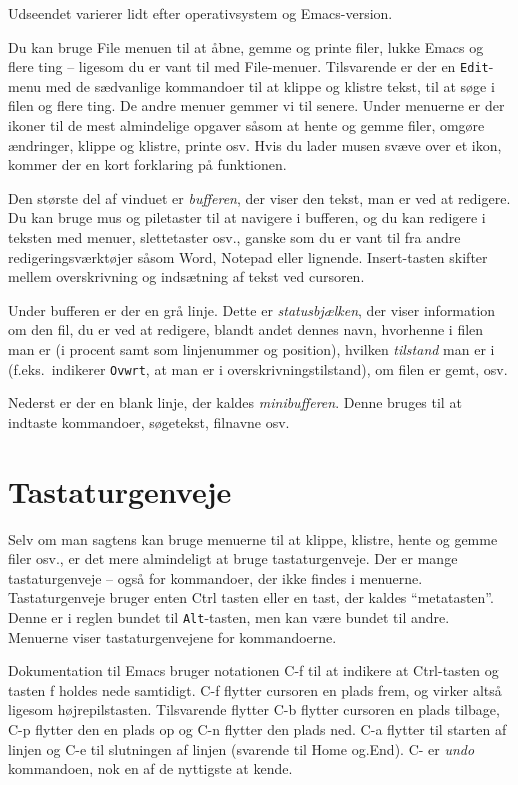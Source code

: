 \documentclass[a4paper]{article}
\begin{document}
\noindent
Udseendet varierer lidt efter operativsystem og Emacs-version.

Du kan bruge \textsf{File} menuen til at åbne, gemme og printe filer,
lukke Emacs og flere ting -- ligesom du er vant til med
\textsf{File}-menuer.  Tilsvarende er der en \texttt{Edit}-menu med de
sædvanlige kommandoer til at klippe og klistre tekst, til at søge i
filen og flere ting.  De andre menuer gemmer vi til senere.  Under
menuerne er der ikoner til de mest almindelige opgaver såsom at hente
og gemme filer, omgøre ændringer, klippe og klistre, printe osv.  Hvis
du lader musen svæve over et ikon, kommer der en kort forklaring på funktionen.

Den største del af vinduet er \emph{bufferen}, der viser den tekst,
man er ved at redigere.  Du kan bruge mus og piletaster til at
navigere i bufferen, og du kan redigere i teksten med menuer,
slettetaster osv., ganske som du er vant til fra andre
redigeringsværktøjer såsom Word, Notepad eller lignende.
\textsf{Insert}-tasten skifter mellem overskrivning og indsætning af
tekst ved cursoren.

Under bufferen er der en grå linje.  Dette er \emph{statusbjælken},
der viser information om den fil, du er ved at redigere, blandt andet
dennes navn, hvorhenne i filen man er (i procent samt som linjenummer
og position), hvilken \emph{tilstand} man er i (f.eks.\ indikerer
\texttt{Ovwrt}, at man er i overskrivningstilstand), om filen er gemt,
osv.

Nederst er der en blank linje, der kaldes \emph{minibufferen}.  Denne
bruges til at indtaste kommandoer, søgetekst, filnavne osv.

\section{Tastaturgenveje}\label{genveje}

Selv om man sagtens kan bruge menuerne til at klippe, klistre, hente
og gemme filer osv., er det mere almindeligt at bruge tastaturgenveje.
Der er mange tastaturgenveje -- også for kommandoer, der ikke findes i
menuerne.  Tastaturgenveje bruger enten \textsf{Ctrl} tasten eller en
tast, der kaldes ``metatasten''.  Denne er i reglen bundet til
\texttt{Alt}-tasten, men kan være bundet til andre.  Menuerne viser
tastaturgenvejene for kommandoerne.

Dokumentation til Emacs bruger notationen \textsf{C-f} til at indikere
at \textsf{Ctrl}-tasten og tasten \textsf{f} holdes nede samtidigt.
\textsf{C-f} flytter cursoren en plads frem, og virker altså ligesom
højrepilstasten.  Tilsvarende flytter \textsf{C-b} flytter cursoren en
plads tilbage, \textsf{C-p} flytter den en plads op og \textsf{C-n}
flytter den plads ned. \textsf{C-a} flytter til starten af linjen og
\textsf{C-e} til slutningen af linjen (svarende til \textsf{Home}
og.\textsf{End}). \textsf{C-\underline{}} er \emph{undo} kommandoen,
nok en af de nyttigste at kende.
\end{document}
